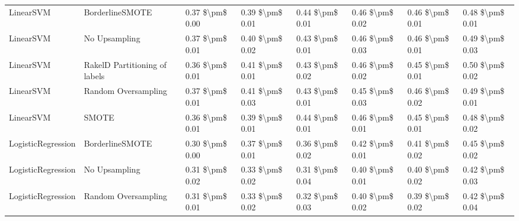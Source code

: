 \begin{tabular}{llllllll}
                      LinearSVM &               BorderlineSMOTE & 0.37 \$\textbackslash pm\$ 0.00 &           0.39 \$\textbackslash pm\$ 0.01 &       0.44 \$\textbackslash pm\$ 0.01 &        0.46 \$\textbackslash pm\$ 0.02 &                         0.46 \$\textbackslash pm\$ 0.01 &     0.48 \$\textbackslash pm\$ 0.01 \\
                      LinearSVM &                 No Upsampling & 0.37 \$\textbackslash pm\$ 0.01 &           0.40 \$\textbackslash pm\$ 0.02 &       0.43 \$\textbackslash pm\$ 0.01 &        0.46 \$\textbackslash pm\$ 0.03 &                         0.46 \$\textbackslash pm\$ 0.01 &     0.49 \$\textbackslash pm\$ 0.03 \\
                      LinearSVM & RakelD Partitioning of labels & 0.36 \$\textbackslash pm\$ 0.01 &           0.41 \$\textbackslash pm\$ 0.01 &       0.43 \$\textbackslash pm\$ 0.02 &        0.46 \$\textbackslash pm\$ 0.02 &                         0.45 \$\textbackslash pm\$ 0.01 &     0.50 \$\textbackslash pm\$ 0.02 \\
                      LinearSVM &           Random Oversampling & 0.37 \$\textbackslash pm\$ 0.01 &           0.41 \$\textbackslash pm\$ 0.03 &       0.43 \$\textbackslash pm\$ 0.01 &        0.45 \$\textbackslash pm\$ 0.03 &                         0.46 \$\textbackslash pm\$ 0.02 &     0.49 \$\textbackslash pm\$ 0.01 \\
                      LinearSVM &                         SMOTE & 0.36 \$\textbackslash pm\$ 0.01 &           0.39 \$\textbackslash pm\$ 0.01 &       0.44 \$\textbackslash pm\$ 0.01 &        0.46 \$\textbackslash pm\$ 0.01 &                         0.45 \$\textbackslash pm\$ 0.01 &     0.48 \$\textbackslash pm\$ 0.02 \\
             LogisticRegression &               BorderlineSMOTE & 0.30 \$\textbackslash pm\$ 0.00 &           0.37 \$\textbackslash pm\$ 0.01 &       0.36 \$\textbackslash pm\$ 0.02 &        0.42 \$\textbackslash pm\$ 0.01 &                         0.41 \$\textbackslash pm\$ 0.02 &     0.45 \$\textbackslash pm\$ 0.02 \\
             LogisticRegression &                 No Upsampling & 0.31 \$\textbackslash pm\$ 0.02 &           0.33 \$\textbackslash pm\$ 0.02 &       0.31 \$\textbackslash pm\$ 0.04 &        0.40 \$\textbackslash pm\$ 0.01 &                         0.40 \$\textbackslash pm\$ 0.02 &     0.42 \$\textbackslash pm\$ 0.03 \\
             LogisticRegression &           Random Oversampling & 0.31 \$\textbackslash pm\$ 0.01 &           0.33 \$\textbackslash pm\$ 0.02 &       0.32 \$\textbackslash pm\$ 0.03 &        0.40 \$\textbackslash pm\$ 0.02 &                         0.39 \$\textbackslash pm\$ 0.02 &     0.42 \$\textbackslash pm\$ 0.04 \\

\end{tabular}
